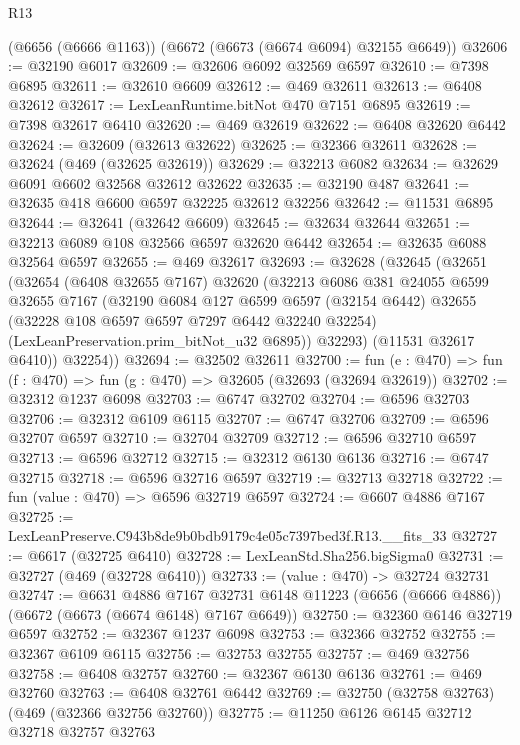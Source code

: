 \begin{lexlean}{R13}
\begin{coremodule}
    (@6656 (@6666 @1163))
    (@6672 (@6673 (@6674 @6094) @32155 @6649))
@32606 := @32190 @6017
@32609 := @32606 @6092 @32569 @6597
@32610 := @7398 @6895
@32611 := @32610 @6609
@32612 := @469 @32611
@32613 := @6408 @32612
@32617 := LexLeanRuntime.bitNot @470 @7151 @6895
@32619 := @7398 @32617 @6410
@32620 := @469 @32619
@32622 := @6408 @32620 @6442
@32624 := @32609 (@32613 @32622)
@32625 := @32366 @32611
@32628 := @32624 (@469 (@32625 @32619))
@32629 := @32213 @6082
@32634 := @32629 @6091 @6602 @32568 @32612 @32622
@32635 := @32190 @487
@32641 := @32635 @418 @6600 @6597 @32225 @32612 @32256
@32642 := @11531 @6895
@32644 := @32641 (@32642 @6609)
@32645 := @32634 @32644
@32651 := @32213 @6089 @108 @32566 @6597 @32620 @6442
@32654 := @32635 @6088 @32564 @6597
@32655 := @469 @32617
@32693 := @32628
    (@32645
      (@32651
        (@32654
          (@6408 @32655 @7167)
          @32620
          (@32213
            @6086
            @381
            @24055
            @6599
            @32655
            @7167
            (@32190
              @6084
              @127
              @6599
              @6597
              (@32154 @6442)
              @32655
              (@32228 @108 @6597 @6597 @7297 @6442 @32240 @32254)
              (LexLeanPreservation.prim_bitNot_u32 @6895))
            @32293)
          (@11531 @32617 @6410))
        @32254))
@32694 := @32502 @32611
@32700 := fun (e : @470) => fun (f : @470) => fun (g : @470) => @32605 (@32693 (@32694 @32619))
@32702 := @32312 @1237 @6098
@32703 := @6747 @32702
@32704 := @6596 @32703
@32706 := @32312 @6109 @6115
@32707 := @6747 @32706
@32709 := @6596 @32707 @6597
@32710 := @32704 @32709
@32712 := @6596 @32710 @6597
@32713 := @6596 @32712
@32715 := @32312 @6130 @6136
@32716 := @6747 @32715
@32718 := @6596 @32716 @6597
@32719 := @32713 @32718
@32722 := fun (value : @470) => @6596 @32719 @6597
@32724 := @6607 @4886 @7167
@32725 := LexLeanPreserve.C943b8de9b0bdb9179c4e05c7397bed3f.R13.__fits_33
@32727 := @6617 (@32725 @6410)
@32728 := LexLeanStd.Sha256.bigSigma0
@32731 := @32727 (@469 (@32728 @6410))
@32733 := (value : @470) -> @32724 @32731
@32747 := @6631
    @4886
    @7167
    @32731
    @6148
    @11223
    (@6656 (@6666 @4886))
    (@6672 (@6673 (@6674 @6148) @7167 @6649))
@32750 := @32360 @6146 @32719 @6597
@32752 := @32367 @1237 @6098
@32753 := @32366 @32752
@32755 := @32367 @6109 @6115
@32756 := @32753 @32755
@32757 := @469 @32756
@32758 := @6408 @32757
@32760 := @32367 @6130 @6136
@32761 := @469 @32760
@32763 := @6408 @32761 @6442
@32769 := @32750 (@32758 @32763) (@469 (@32366 @32756 @32760))
@32775 := @11250 @6126 @6145 @32712 @32718 @32757 @32763

\end{coremodule}
\end{lexlean}
